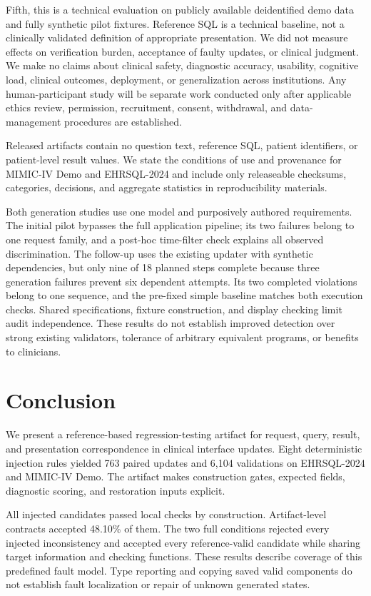 \documentclass[manuscript,review,anonymous]{acmart}
\begin{document}
Fifth, this is a technical evaluation on publicly available deidentified demo data and fully synthetic pilot fixtures. Reference SQL is a technical baseline, not a clinically validated definition of appropriate presentation. We did not measure effects on verification burden, acceptance of faulty updates, or clinical judgment. We make no claims about clinical safety, diagnostic accuracy, usability, cognitive load, clinical outcomes, deployment, or generalization across institutions. Any human-participant study will be separate work conducted only after applicable ethics review, permission, recruitment, consent, withdrawal, and data-management procedures are established.

Released artifacts contain no question text, reference SQL, patient identifiers, or patient-level result values. We state the conditions of use and provenance for MIMIC-IV Demo and EHRSQL-2024 and include only releaseable checksums, categories, decisions, and aggregate statistics in reproducibility materials.

Both generation studies use one model and purposively authored requirements. The initial pilot bypasses the full application pipeline; its two failures belong to one request family, and a post-hoc time-filter check explains all observed discrimination. The follow-up uses the existing updater with synthetic dependencies, but only nine of 18 planned steps complete because three generation failures prevent six dependent attempts. Its two completed violations belong to one sequence, and the pre-fixed simple baseline matches both execution checks. Shared specifications, fixture construction, and display checking limit audit independence. These results do not establish improved detection over strong existing validators, tolerance of arbitrary equivalent programs, or benefits to clinicians.

\section{Conclusion}

We present a reference-based regression-testing artifact for request, query, result, and presentation correspondence in clinical interface updates. Eight deterministic injection rules yielded 763 paired updates and 6,104 validations on EHRSQL-2024 and MIMIC-IV Demo. The artifact makes construction gates, expected fields, diagnostic scoring, and restoration inputs explicit.

All injected candidates passed local checks by construction. Artifact-level contracts accepted 48.10\% of them. The two full conditions rejected every injected inconsistency and accepted every reference-valid candidate while sharing target information and checking functions. These results describe coverage of this predefined fault model. Type reporting and copying saved valid components do not establish fault localization or repair of unknown generated states.
\end{document}
